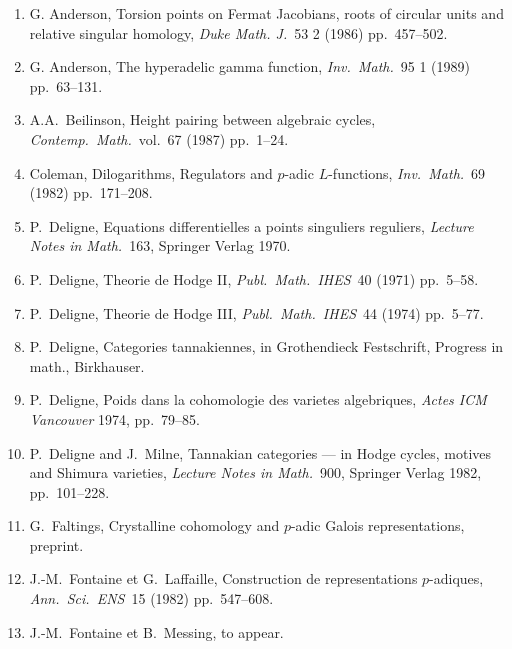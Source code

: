 \documentclass[12pt,a4paper]{article}
\theoremstyle{plain}
\theoremstyle{definition}
\theoremstyle{remark}
\begin{document}
\begin{enumerate}
\item[{[A1]}] G. Anderson, Torsion points on Fermat Jacobians, roots of
circular units and relative singular homology, \textit{Duke Math.
J.}\ 53 2 (1986) pp.\ 457--502.

\item[{[A2]}] G. Anderson, The hyperadelic gamma function,
\textit{Inv.\ Math.}\ 95 1 (1989) pp.\ 63--131.

\item[{[B]}] A.A.\ Beilinson, Height pairing between algebraic cycles,
\textit{Contemp.\ Math.}\ vol.\ 67 (1987) pp.\ 1--24.

\item[{[C]}] Coleman, Dilogarithms, Regulators and $p$-adic
$L$-functions, \textit{Inv.\ Math.}\ 69 (1982) pp.\ 171--208.

\item[{[D1]}] P.\ Deligne, Equations differentielles a points
singuliers reguliers, \textit{Lecture Notes in Math.}\ 163, Springer
Verlag 1970.

\item[{[D2]}] P.\ Deligne, Theorie de Hodge II, \textit{Publ.\ Math.\ IHES}\ 40 (1971) pp.\ 5--58.

\item[{[D3]}] P.\ Deligne, Theorie de Hodge III, \textit{Publ.\ Math.\ IHES}\ 44 (1974) pp.\ 5--77.

\item[{[D4]}] P.\ Deligne, Categories tannakiennes, in Grothendieck
Festschrift, Progress in math., Birkhauser.

\item[{[D5]}] P.\ Deligne, Poids dans la cohomologie des varietes
algebriques, \textit{Actes ICM Vancouver} 1974, pp.\ 79--85.

\item[{[DM]}] P.\ Deligne and J.\ Milne, Tannakian categories --- in
Hodge cycles, motives and Shimura varieties, \textit{Lecture Notes in
Math.}\ 900, Springer Verlag 1982, pp.\ 101--228.

\item[{[Fa]}] G.\ Faltings, Crystalline cohomology and $p$-adic Galois
representations, preprint.

\item[{[FL]}] J.-M.\ Fontaine et G.\ Laffaille, Construction de
representations $p$-adiques, \textit{Ann.\ Sci.\ ENS}\ 15 (1982) pp.\ 547--608.

\item[{[FM]}] J.-M.\ Fontaine et B.\ Messing, to appear.


\end{enumerate}
\end{document}
